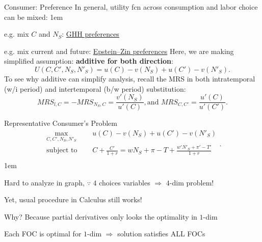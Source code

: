 \documentclass[11pt,aspectratio=43]{beamer}
\let\olditemize=\itemize
\let\endolditemize=\enditemize
\renewenvironment{itemize}{\olditemize \itemsep1em}{\endolditemize}
\theoremstyle{definition}
\begin{document}
\begin{frame}{Consumer: Preference}
\label{slide:Consumer__Preference}
    In general, utility fcn across consumption and labor choice can be mixed:
    \begin{itemize}
        \item e.g. mix $ C $ and $ N_{S} $: \alert{\href{https://tinyurl.com/222w66m9}{GHH preferences}}
        \item e.g. mix current and future: \alert{\href{https://tinyurl.com/2p8a9bb5}{Epstein–Zin preferences}}
    \end{itemize}
    Here, we are making simplified assumption: \textbf{additive for both direction}:
    \begin{equation}
    \label{eq:utility_function}
        U( C, C', N_{S}, N'_{S} ) = u( C ) - v( N_{S}) + u( C' ) - v( N'_{S} )
    .\end{equation}
    To see why \alert{additive} can simplify analysis, recall the MRS in both \alert{intratemporal} (w/i period) and \alert{intertemporal} (b/w period) substitution:
    \begin{equation*}
        MRS_{l, C} = - MRS_{N_{S}, C} = \frac{v'( N_{S} )}{u'( C )}, \text{and } MRS_{C, C'} = \frac{u'( C )}{u'( C' )}
    .\end{equation*}
\end{frame}

\begin{frame}{Representative Consumer's Problem}
\label{slide:Representative_Consumer_s_Problem}
%
\begin{equation}
\label{eq:consumer_problem}
    \begin{split}
        \max_{C, C', N_{S}, N'_{S}} \quad
            & u( C ) - v( N_{S}) + u( C' ) - v( N'_{S} )
        \\
        \text{subject to } \quad
            & C + \frac{C'}{1+r} =
            w N_{S} + \pi - T
            + \frac{w' N'_{S} + \pi' - T'}{1+r}
        \\
    \end{split}
.\end{equation}
%
\begin{itemize}
    \item Hard to analyze in graph, $ \because $ $ 4 $ choices variables $ \Rightarrow  $ $ 4 $-dim problem!
    \item Yet, usual procedure in Calculus still works!
    \item Why? Because \alert{partial derivatives} only looks the optimality in \alert{$ 1 $-dim}
    \item Each FOC is optimal for $ 1 $-dim $ \Rightarrow  $ solution satisfies ALL FOCs
\end{itemize}
\end{frame}
\end{document}
